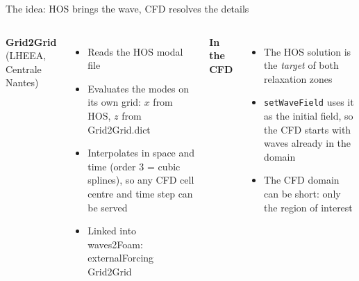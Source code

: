 \documentclass[aspectratio=169,10pt]{beamer}
\newcommand{\file}[1]{{\leavevmode\ttfamily\color{deep}#1}}
\newcommand{\key}[1]{{\leavevmode\ttfamily\color{sea}#1}}
\begin{document}
\begin{frame}{The idea: HOS brings the wave, CFD resolves the details}
  \centering

  \vspace{5mm}
  \begin{columns}[T]
    \small
    \textbf{Grid2Grid} (LHEEA, Centrale Nantes)
    \begin{itemize}
      \item Reads the HOS modal file
      \item Evaluates the modes on its own grid: $x$ from HOS, $z$ from \file{Grid2Grid.dict}
      \item Interpolates in space and time (order 3 = cubic splines), so any CFD cell
            centre and time step can be served
      \item Linked into waves2Foam: \key{externalForcing Grid2Grid}
    \end{itemize}
    \small
    \textbf{In the CFD}
    \begin{itemize}
      \item The HOS solution is the \emph{target} of both relaxation zones
      \item \texttt{setWaveField} uses it as the initial field, so the CFD starts with
            waves already in the domain
      \item The CFD domain can be short: only the region of interest
    \end{itemize}
  \end{columns}
\end{frame}
\end{document}
